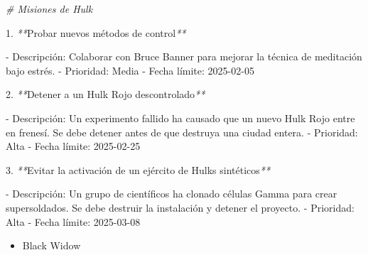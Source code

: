\documentclass[
]{book}
\newenvironment{Shaded}{\begin{snugshade}}{\end{snugshade}}
\newcommand{\CommentTok}[1]{\textcolor[rgb]{0.56,0.35,0.01}{\textit{#1}}}
\newcommand{\ExtensionTok}[1]{#1}
\newcommand{\NormalTok}[1]{#1}
\newcommand{\PreprocessorTok}[1]{\textcolor[rgb]{0.56,0.35,0.01}{\textit{#1}}}
\providecommand{\tightlist}{%
  \setlength{\itemsep}{0pt}\setlength{\parskip}{0pt}}
\begin{document}
\begin{Shaded}
\begin{Highlighting}[]
\CommentTok{\# Misiones de Hulk}

\ExtensionTok{1.} \PreprocessorTok{**}\NormalTok{Probar nuevos métodos de control}\PreprocessorTok{**}

   \ExtensionTok{{-}}\NormalTok{ Descripción: Colaborar con Bruce Banner para mejorar la técnica de meditación bajo estrés.}
   \ExtensionTok{{-}}\NormalTok{ Prioridad: Media}
   \ExtensionTok{{-}}\NormalTok{ Fecha límite: 2025{-}02{-}05}

\ExtensionTok{2.} \PreprocessorTok{**}\NormalTok{Detener a un Hulk Rojo descontrolado}\PreprocessorTok{**}

   \ExtensionTok{{-}}\NormalTok{ Descripción: Un experimento fallido ha causado que un nuevo Hulk Rojo entre en frenesí. Se debe detener antes de que destruya una ciudad entera.}
   \ExtensionTok{{-}}\NormalTok{ Prioridad: Alta}
   \ExtensionTok{{-}}\NormalTok{ Fecha límite: 2025{-}02{-}25}

\ExtensionTok{3.} \PreprocessorTok{**}\NormalTok{Evitar la activación de un ejército de Hulks sintéticos}\PreprocessorTok{**}

   \ExtensionTok{{-}}\NormalTok{ Descripción: Un grupo de científicos ha clonado células Gamma para crear supersoldados. Se debe destruir la instalación y detener el proyecto.}
   \ExtensionTok{{-}}\NormalTok{ Prioridad: Alta}
   \ExtensionTok{{-}}\NormalTok{ Fecha límite: 2025{-}03{-}08}
\end{Highlighting}
\end{Shaded}

\begin{itemize}
\tightlist
\item
  Black Widow
\end{itemize}
\end{document}
